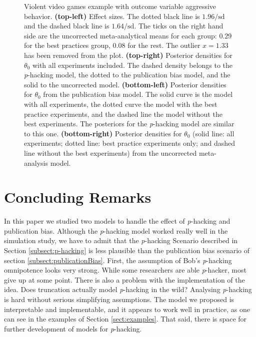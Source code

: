\documentclass{article}
\theoremstyle{plain}
\theoremstyle{definition}
\begin{document}
\begin{figure}
\caption{\label{fig:anderson2010}Violent video games example with outcome variable aggressive behavior. \textbf{(top-left)} Effect sizes. The dotted black line is $1.96/\textrm{sd}$ and the dashed black line is $1.64/\textrm{sd}$. The ticks on the right hand side are the uncorrected meta-analytical means for each group: $0.29$ for the best practices group, $0.08$ for the rest. The outlier $x=1.33$ has been removed from the plot.
\textbf{(top-right)} Posterior densities for $\theta_{0}$ with all experiments included. The dashed density belongs to the \textit{p}-hacking model, the dotted to the publication bias model, and the solid to the uncorrected model. \textbf{(bottom-left)} Posterior densities for $\theta_{0}$ from the publication bias model. The solid curve is the model with all experiments, the dotted curve the model with the best practice experiments, and the dashed line the model without the best experiments. The posteriors for the \textit{p}-hacking model are similar to this one. \textbf{(bottom-right)} Posterior densities for $\theta_{0}$ (solid line: all experiments; dotted line: best practice experiments only; and dashed line without the best experiments) from the uncorrected meta-analysis model.}
\end{figure}

\section{Concluding Remarks}\label{sect:conclusions}

In this paper we studied two models to handle the effect of \textit{p}-hacking and publication bias. Although the \textit{p}-hacking model worked really well in the simulation study, we have to admit that the \textit{p}-hacking Scenario described in Section \ref{subsect:p-hacking} is less plausible than the publication bias scenario of section \ref{subsect:publicationBias}. First, the assumption of Bob's \textit{p}-hacking omnipotence looks very strong. While some researchers are able \textit{p}-hacker, most give up at some point. There is also a problem with the implementation of the idea. Does truncation actually model \textit{p}-hacking in the wild? Analysing \textit{p}-hacking is hard without serious simplifying assumptions. The model we proposed is interpretable and implementable, and it appears to work well in practice, as one can see in the examples of Section \ref{sect:examples}. That said, there is space for further development of models for \textit{p}-hacking.
\end{document}
